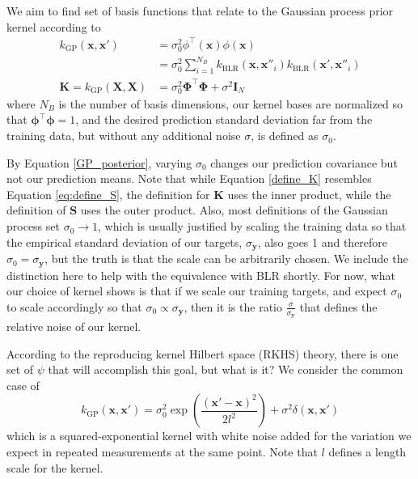 \documentclass{article}
\begin{document}
We aim to find set of basis functions that relate to the Gaussian process prior kernel according to 
\begin{equation}
\label{define_K}
\begin{split}
     k_\text{GP}(\mathbf{x},\mathbf{x}') &= \sigma_0^2\phi^\top(\mathbf{x})\phi(\mathbf{x}) \\& = \sigma_0^2\sum_{i=1}^{N_B}k_\text{BLR}(\mathbf{x},\mathbf{x}''_i)k_\text{BLR}(\mathbf{x'},\mathbf{x}''_i) \\
     \mathbf{K}=k_{\text{GP}}(\mathbf{X},\mathbf{X})& = \sigma_0^2\boldsymbol{\Phi}^\top \boldsymbol{\Phi} + \sigma^2\mathbf{I}_N
     \end{split}
\end{equation}
where $N_B$ is the number of basis dimensions, our kernel bases are normalized so that $\boldsymbol{\phi}^\top\boldsymbol{\phi}=1$, and the desired prediction standard deviation far from the training data, but without any additional noise $\sigma$, is defined as $\sigma_0$. 

By Equation \ref{GP_posterior}, varying $\sigma_0$ changes our prediction covariance but not our prediction means. Note that while Equation \ref{define_K} resembles Equation \ref{eq:define_S}, the definition for $\mathbf{K}$ uses the inner product, while the definition of $\mathbf{S}$ uses the outer product.  Also, most definitions of the Gaussian process set $\sigma_0\rightarrow 1$, which is usually justified by scaling the training data so that the empirical standard deviation of our targets, $\sigma_\mathbf{y}$, also goes 1 and therefore $\sigma_0=\sigma_\mathbf{y}$, but the truth is that the scale can be arbitrarily chosen. We include the distinction here to help with the equivalence with BLR shortly. For now, what our choice of kernel shows is that if we scale our training targets, and expect $\sigma_0$ to scale accordingly so that $\sigma_0\propto\sigma_\mathbf{y}$, then it is the ratio $\frac{\sigma}{\sigma_\mathbf{y}}$ that defines the relative noise of our kernel.

According to the reproducing kernel Hilbert space (RKHS) theory, there is one set of $\psi$ that will accomplish this goal, but what is it? We consider the common case of 
\begin{equation}
\label{kernel}
    k_\text{GP}(\mathbf{x},\mathbf{x}') = \sigma_0^2\exp\left(\frac{(\mathbf{x}'-\mathbf{x})^2}{2l^2}\right) + \sigma^2 \delta(\mathbf{x}, \mathbf{x}')
\end{equation}which is a squared-exponential kernel with white noise added for the variation we expect in repeated measurements at the same point. Note that $l$ defines a length scale for the kernel.
\end{document}
